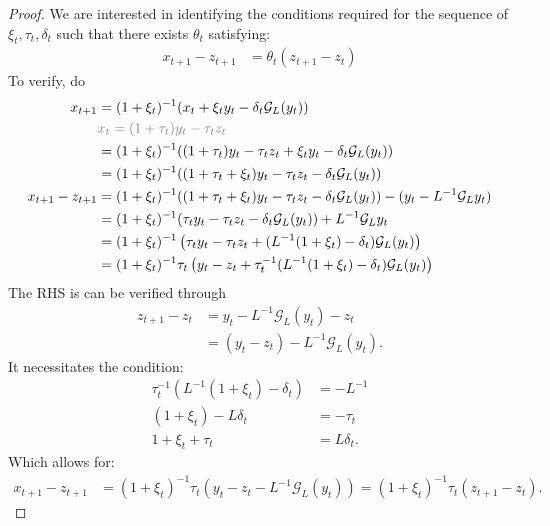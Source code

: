 \documentclass[12pt]{article}
\begin{document}
    \begin{proof}
        We are interested in identifying the conditions required for the sequence of $\xi_t, \tau_t, \delta_t$ such that there exists $\theta_t$ satisfying: 
        \begin{align*}
            x_{t + 1} - z_{t + 1} 
            &= \theta_t(z_{t + 1} - z_t)
        \end{align*}
        To verify, do 
        \begin{align*}
            x_{t + 1} &= 
            (1 + \xi_t)^{-1}(x_t + \xi_t y_t - \delta_t \mathcal G_L(y_t))
            \\
            & \textcolor{gray}{
                x_t = (1 + \tau_t)y_t - \tau_t z_t
            }
            \\
            &= 
            (1 + \xi_t)^{-1}((1 + \tau_t)y_t - \tau_t z_t + \xi_t y_t - \delta_t \mathcal G_L(y_t))
            \\
            &= 
            (1 + \xi_t)^{-1}((1 + \tau_t + \xi_t)y_t - \tau_t z_t - \delta_t \mathcal G_L(y_t))
            \\
            x_{t + 1} - z_{t + 1}
            &= 
            (1 + \xi_t)^{-1}((1 + \tau_t + \xi_t)y_t - \tau_t z_t - \delta_t \mathcal G_L(y_t))
            - (y_t - L^{-1}\mathcal G_Ly_t)
            \\
            &= 
            (1 + \xi_t)^{-1}(\tau_ty_t - \tau_t z_t - \delta_t \mathcal G_L(y_t))
            + L^{-1}\mathcal G_Ly_t
            \\
            &= 
            (1 + \xi_t)^{-1}
            \left(
                \tau_ty_t - \tau_t z_t + (L^{-1}(1 + \xi_t) - \delta_t) \mathcal G_L(y_t)
            \right)
            \\
            &= 
            (1 + \xi_t)^{-1}\tau_t
            \left(
                y_t - z_t + 
                \tau_t^{-1}(L^{-1}(1 + \xi_t) - \delta_t) \mathcal G_L(y_t)
            \right)
        \end{align*}
        The RHS is can be verified through 
        \begin{align*}
            z_{t + 1} - z_t &= 
            y_t - L^{-1}\mathcal G_L(y_t) - z_t
            \\
            &= (y_t - z_t) - L^{-1}\mathcal G_L(y_t). 
        \end{align*}
        It necessitates the condition: 
        \begin{align*}
            \tau_t^{-1}(L^{-1}(1 + \xi_t) - \delta_t) 
            &= - L^{-1}
            \\
            (1 + \xi_t) - L\delta_t
            &= 
            - \tau_t
            \\
            1 + \xi_t + \tau_t
            &=
            L\delta_t. 
        \end{align*}
        Which allows for: 
        \begin{align*}
            x_{t + 1} - z_{t + 1} &= 
            (1 + \xi_t)^{-1}\tau_t
            \left(y_t - z_t - L^{-1}\mathcal G_L(y_t)\right) 
            = 
            (1 + \xi_t)^{-1}\tau_t(z_{t + 1} - z_t). 
        \end{align*}
    \end{proof}
\end{document}
